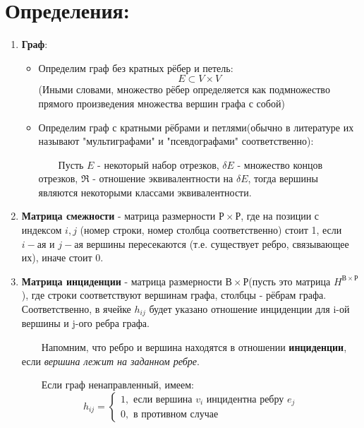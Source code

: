 \documentclass[a4paper,12pt]{article}
\begin{document}
    \section{Определения:}
        \begin{enumerate}
            \item \textbf{Граф}:
                \begin{itemize}
                    \item Определим граф без кратных рёбер и петель: 
                    $$
                    E \subset V \times V 
                    $$
                    (Иными словами, множество рёбер определяется как подмножество прямого произведения множества вершин графа с собой)
                    \item Определим граф с кратными рёбрами и петлями(обычно в литературе их называют "мультиграфами" и "псевдографами" соответственно):
                    
                    $\qquad$Пусть $E$ - некоторый набор отрезков, $\delta E$ - множество концов отрезков, $\mathfrak{R}$ - отношение эквивалентности на $\delta E$, тогда вершины являются некоторыми классами эквивалентности.
                \end{itemize} 
                
            \item \textbf{Матрица смежности} - матрица размерности $Р\times Р$, где на позиции с индексом $i, j$ (номер строки, номер столбца соответственно) стоит 1, если $i-ая$ и $j-ая$ вершины пересекаются (т.е. существует ребро, связывающее их), иначе стоит 0.
            \item \textbf{Матрица инциденции} - матрица размерности $В\times Р$(пусть это матрица $H^{В\times Р}$), где строки соответствуют вершинам графа, столбцы - рёбрам графа. Соответственно, в ячейке $h_{i j}$ будет указано отношение инциденции для i-ой вершины и j-ого ребра графа. 

            $\qquad$Напомним, что ребро и вершина находятся в отношении \textbf{инциденции}, если \textit{вершина лежит на заданном ребре}.
            
            $\qquad$Если граф ненаправленный, имеем:
                 \begin{equation*}
                    h_{i j} = 
                   \begin{cases}
                       1,  \text{ если вершина } v_i \text{ инцидентна ребру } e_j\\
                       0, \text{ в противном случае}
                   \end{cases}
                \end{equation*} 
            \begin{figure}[ht]


\end{figure}
\end{enumerate}
\end{document}
